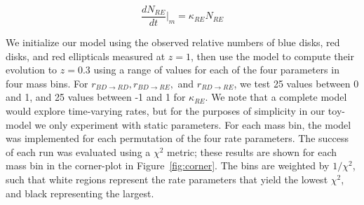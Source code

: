 \documentclass[useAMS,usenatbib]{mn2e}
\begin{document}
\begin{equation}
\frac{dN_{RE}}{dt}\Big\rvert_{m} = \kappa_{RE} N_{RE}  
\label{eqn:RE}
\end{equation}

We initialize our model using the observed relative numbers of blue disks, red disks, and red ellipticals measured at $z=1$, then use the model to compute their evolution to $z=0.3$ using a range of values for each of the four parameters in four mass bins. For $r_{BD \rightarrow RD}, r_{BD \rightarrow RE},$ and $r_{RD \rightarrow RE}$, we test 25 values between 0 and 1, and 25 values between -1 and 1 for $\kappa_{RE}$. We note that a complete model would explore time-varying rates, but for the purposes of simplicity in our toy-model we only experiment with static parameters. For each mass bin, the model was implemented for each permutation of the four rate parameters. The success of each run was evaluated using a $\chi^2$ metric; these results are shown for each mass bin in the corner-plot in Figure~\ref{fig:corner}. The bins are weighted by $1/\chi^2$, such that white regions represent the rate parameters that yield the lowest $\chi^2$, and black representing the largest.
\end{document}
